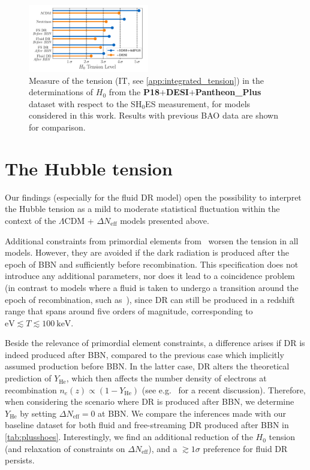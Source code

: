 \documentclass[aps,prd,twocolumn,notitlepage,
superscriptaddress,
nofootinbib,floatfix]{revtex4-2}
\newcommand{\planck}{\textbf{P18}}
\newcommand{\desi}{$\mathbf{+}$\textbf{DESI}}
\newcommand{\pantheon}{$\mathbf{+}${\bf Pantheon\_Plus}}
\newcommand{\DNeff}{\Delta N_\text{eff}}
\begin{document}
\begin{figure}[t]
    \includegraphics[width=0.47\textwidth]{figures_21_4/H0tension_lollipop_noH0.pdf}
    \caption{Measure of the tension (IT, see \cref{app:integrated_tension}) in the determinations of $H_0$ from the \planck\desi\pantheon \,  dataset with respect to the SH$_0$ES measurement, for models considered in this work. Results with previous BAO data are shown for comparison.}
    \label{fig:lollipop}
\end{figure}

\section{The Hubble tension}\label{sec:Hubble tension}

Our findings (especially for the fluid DR model) open the possibility to interpret the Hubble tension as a mild to moderate statistical fluctuation within the context of the $\Lambda$CDM + $\Delta N_\text{eff}$ models presented above.

Additional constraints from primordial elements from~\cite{Aver:2015iza, Cooke:2017cwo} worsen the tension in all models. However, they are avoided if the dark radiation is produced after the epoch of BBN and sufficiently before recombination. This specification does not introduce any additional parameters, nor does it lead to a coincidence problem (in contrast to models where a fluid is taken to undergo a transition around the epoch of recombination, such as~\cite{Poulin:2018cxd, Niedermann:2019olb, Gonzalez:2020fdy, Allali:2021azp, Aloni:2021eaq}), since DR can still be produced in a redshift range that spans around five orders of magnitude, corresponding to $\text{eV}\lesssim T\lesssim 100~\text{keV}$. 

Beside the relevance of primordial element constraints, a difference arises if DR is indeed produced after BBN, compared to the previous case which implicitly assumed production before BBN. In the latter case, DR alters the theoretical prediction of $Y_\text{He}$, which then affects the number density of electrons at recombination $n_e(z)\propto (1-Y_\text{He})$ (see e.g.~\cite{Cyr-Racine:2021oal} for a recent discussion). Therefore, when considering the scenario where DR is produced after BBN, we determine $Y_\text{He}$ by setting $\Delta N_\text{eff}=0$ at BBN. 
We compare the inferences made with our baseline dataset for both fluid and free-streaming DR produced after BBN in \cref{tab:plusshoes}.
Interestingly, we find an additional reduction of the $H_0$ tension (and relaxation of constraints on $\DNeff$), and a $\gtrsim 1\sigma$ preference for fluid DR persists.
\end{document}
